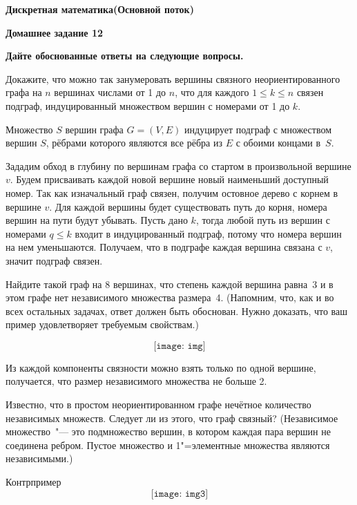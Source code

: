 \documentclass[11pt]{article}
\def\week{12}
\def\theproblem{К\week.\arabic{problem}}
\begin{document}
	
	\newpage
	\setcounter{problem}{0}
	\def\theproblem{Д\week.\arabic{problem}}
	{\textbf{\large Дискретная математика}\hfill \textbf{(Основной поток)}
		
		\medskip %
		
		\textbf{Домашнее задание \week}}
	
	\medskip
	
	\textbf{Дайте обоснованные ответы на следующие вопросы.}
	
	
	\vspace{5mm}
	
	
	
	\p Докажите, что можно так занумеровать вершины связного
	неориентированного графа на $n$ вершинах числами от 1 до $n$, что для
	каждого $1\leq k\leq n$ связен подграф, индуцированный множеством вершин с
	номерами от 1 до $k$. 
	
	Множество $S$ вершин графа $G = (V,E)$ индуцирует  подграф с
	множеством вершин $S$,  рёбрами которого являются все рёбра из $E$ с обоими концами в~$S$.
	
	Зададим обход в глубину по вершинам графа со стартом в произвольной вершине $v$. Будем присваивать каждой новой вершине новый наименьший доступный номер. Так как изначальный граф связен, получим остовное дерево с корнем в вершине $v$. Для каждой вершины будет существовать путь до корня, номера вершин на пути будут убывать. Пусть дано $k$, тогда любой путь из вершин с номерами $q \leq k$ входит в индуцированный подграф, потому что номера вершин на нем уменьшаются. Получаем, что в подграфе каждая вершина связана с $v$, значит подграф связен. 
	
	\p Найдите такой граф на 8 вершинах, что степень каждой вершина равна~3 и
	в этом графе нет независимого множества размера~4. (Напомним, что, как
	и во всех остальных задачах, ответ должен быть обоснован. Нужно
	доказать, что ваш пример удовлетворяет требуемым свойствам.)
	
	\[\texttt{[image: img]}\]
	
	Из каждой компоненты связности можно взять только по одной вершине, получается, что размер независимого множества не больше 2. 
	
	\p Известно, что в простом неориентированном графе нечётное количество независимых множеств. Следует ли из этого, что граф связный?
	(Независимое множество~"--- это подмножество вершин, в котором каждая пара вершин не соединена ребром. Пустое множество и 1"=элементные множества являются  независимыми.)
	
	Контрпример 
	\[\texttt{[image: img3]}\]
	
\end{document}
